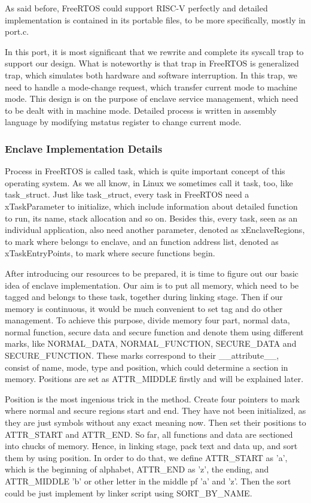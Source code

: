 \documentclass[conference]{IEEEtran}
\begin{document}
As said before, FreeRTOS could support RISC-V perfectly and detailed implementation is contained in its portable files, to be more specifically, mostly in port.c.  

In this port, it is most significant that we rewrite and complete its syscall trap to support our design. What is noteworthy is that trap in FreeRTOS is generalized trap, which simulates both hardware and software interruption. In this trap, we need to handle a mode-change request, which transfer current mode to machine mode. This design is on the purpose of enclave service management, which need to be dealt with in machine mode. Detailed process is written in assembly language by modifying mstatus register to change current mode.

\subsubsection{Enclave Implementation Details}

Process in FreeRTOS  is called task, which is quite important concept of this operating system. As we all know, in Linux we sometimes call it task, too, like task\_struct. Just like task\_struct, every task in FreeRTOS need a xTaskParameter to initialize, which include information about detailed function to run, its name, stack allocation and so on. Besides this, every task, seen as an individual application, also need another parameter, denoted as xEnclaveRegions, to mark where belongs to enclave, and an function address list, denoted as xTaskEntryPoints, to mark where secure functions begin.

After introducing our resources to be prepared, it is time to figure out our basic idea of enclave implementation. Our aim is to put all memory, which need to be tagged and belongs to these task, together during linking stage. Then if our memory is continuous, it would be much convenient to set tag and do other management. To achieve this purpose, divide memory four part, normal data, normal function, secure data and secure function and denote them using different marks, like NORMAL\_DATA, NORMAL\_FUNCTION, SECURE\_DATA and SECURE\_FUNCTION. These marks correspond to their \_\_attribute\_\_, consist of name, mode, type and position, which could determine a section in memory. Positions are set as ATTR\_MIDDLE firstly and will be explained later.

Position is the most ingenious trick in the method. Create four pointers to mark where normal and secure regions start and end. They have not been initialized, as they are just symbols without any exact meaning now. Then set their positions to ATTR\_START and ATTR\_END. So far, all functions and data are sectioned into chucks of memory.  Hence, in linking stage, pack text and data up, and sort them by using position. In order to do that, we define ATTR\_START as 'a', which is the beginning of alphabet, ATTR\_END as 'z', the ending, and ATTR\_MIDDLE 'b' or other letter in the middle pf 'a' and 'z'. Then the sort could be just implement by linker script using SORT\_BY\_NAME.
\end{document}
